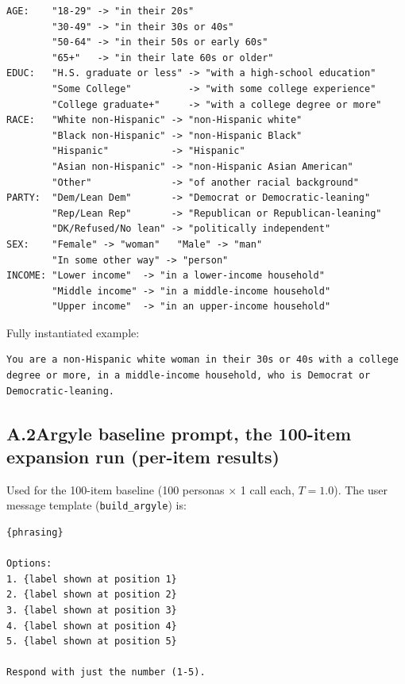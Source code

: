 \begin{verbatim}
AGE:    "18-29" -> "in their 20s"
        "30-49" -> "in their 30s or 40s"
        "50-64" -> "in their 50s or early 60s"
        "65+"   -> "in their late 60s or older"
EDUC:   "H.S. graduate or less" -> "with a high-school education"
        "Some College"          -> "with some college experience"
        "College graduate+"     -> "with a college degree or more"
RACE:   "White non-Hispanic" -> "non-Hispanic white"
        "Black non-Hispanic" -> "non-Hispanic Black"
        "Hispanic"           -> "Hispanic"
        "Asian non-Hispanic" -> "non-Hispanic Asian American"
        "Other"              -> "of another racial background"
PARTY:  "Dem/Lean Dem"       -> "Democrat or Democratic-leaning"
        "Rep/Lean Rep"       -> "Republican or Republican-leaning"
        "DK/Refused/No lean" -> "politically independent"
SEX:    "Female" -> "woman"   "Male" -> "man"
        "In some other way" -> "person"
INCOME: "Lower income"  -> "in a lower-income household"
        "Middle income" -> "in a middle-income household"
        "Upper income"  -> "in an upper-income household"
\end{verbatim}

Fully instantiated example:

\begin{verbatim}
You are a non-Hispanic white woman in their 30s or 40s with a college
degree or more, in a middle-income household, who is Democrat or
Democratic-leaning.
\end{verbatim}

\subsection*{A.2\quad Argyle baseline prompt, the 100-item expansion run (per-item results)}

Used for the 100-item baseline (100 personas $\times$ 1 call each,
$T{=}1.0$). The user message template (\texttt{build\_argyle}) is:

\begin{verbatim}
{phrasing}

Options:
1. {label shown at position 1}
2. {label shown at position 2}
3. {label shown at position 3}
4. {label shown at position 4}
5. {label shown at position 5}

Respond with just the number (1-5).
\end{verbatim}

